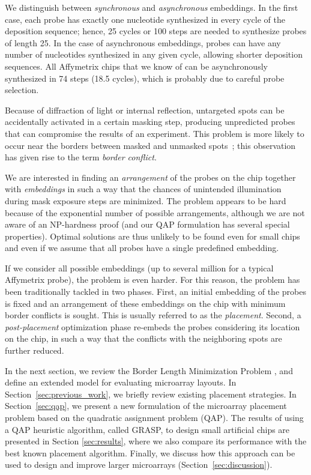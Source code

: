\documentclass[english]{lni}
\begin{document}
We distinguish between \emph{synchronous} and \emph{asynchronous} embeddings.
In the first case, each probe has exactly one nucleotide synthesized in every
cycle of the deposition sequence; hence, 25 cycles or 100 steps are needed to
synthesize probes of length 25. In the case of asynchronous embeddings,
probes can have any number of nucleotides synthesized in any given cycle,
allowing shorter deposition sequences. All Affymetrix chips that we know of
can be asynchronously synthesized in 74 steps (18.5 cycles), which is probably
due to careful probe selection.

Because of diffraction of light or internal reflection, untargeted spots can
be accidentally activated in a certain masking step, producing
unpredicted probes that can compromise the results of an experiment. This
problem is more likely to occur near the borders between masked and unmasked
spots~\cite{FODOR91}; this observation has given rise to the term
\emph{border conflict}.

We are interested in finding an \emph{arrangement} of the probes on the chip
together with \emph{embeddings} in such a way that the chances of unintended
illumination during mask exposure steps are minimized. The problem appears to
be hard because of the exponential number of possible arrangements, although
we are not aware of an NP-hardness proof (and our QAP formulation has several
special properties). Optimal solutions are thus unlikely to be found even
for small chips and even if we assume that all probes have a single predefined
embedding.

If we consider all possible embeddings (up to several million for a
typical Affymetrix probe), the problem is even harder.
For this reason, the problem has been traditionally tackled in two phases.
First, an initial embedding of the probes is fixed and an arrangement of these
embeddings on the chip with minimum border conflicts is sought. This is
usually referred to as the \emph{placement}. Second, a \emph{post-placement}
optimization phase re-embeds the probes considering its location on the chip,
in such a way that the conflicts with the neighboring spots are further
reduced.

In the next section, we review the Border Length Minimization Problem
\cite{HANNENHALLI02}, and define an extended model for evaluating microarray
layouts. In Section~\ref{sec:previous_work}, we briefly review existing
placement strategies. In Section~\ref{sec:qap}, we present a new formulation
of the microarray placement problem based on the quadratic assignment problem (QAP). The
results of using a QAP heuristic algorithm, called GRASP, to design small
artificial chips are presented in Section \ref{sec:results}, where we also
compare its performance with the best known placement algorithm. Finally, we
discuss how this approach can be used to design and improve larger microarrays
(Section~\ref{sec:discussion}).
\end{document}
